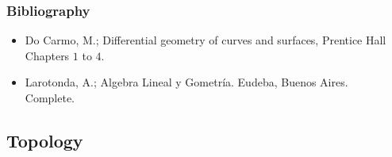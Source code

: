 \documentclass[spanish]{article}
\begin{document}
\subsubsection{Bibliography}
\begin{itemize}
  \item
Do Carmo, M.; Differential geometry of curves and surfaces, Prentice Hall\\
Chapters $1$ to $4$.

  \item
Larotonda, A.; Algebra Lineal y Gometría. Eudeba, Buenos Aires.\\
Complete.
\end{itemize}




\hrulefill%

\subsection{Topology}
\end{document}

